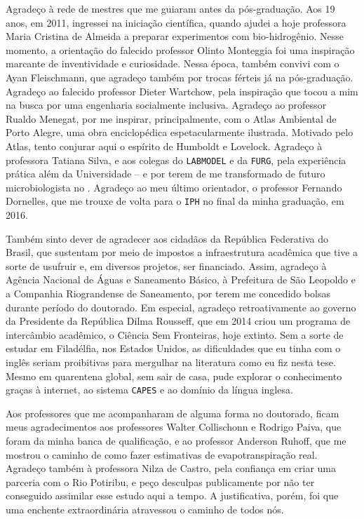\documentclass[./main.tex]{subfiles}
\begin{document}
\par Agradeço à rede de mestres que me guiaram antes da pós-graduação. Aos 19 anos, em 2011, ingressei na iniciação científica, quando ajudei a hoje professora Maria Cristina de Almeida a preparar experimentos com bio-hidrogênio. Nesse momento, a orientação do falecido professor Olinto Monteggia foi uma inspiração marcante de inventividade e curiosidade. Nessa época, também convivi com o Ayan Fleischmann, que agradeço também por trocas férteis já na pós-graduação. Agradeço ao falecido professor Dieter Wartchow, pela inspiração que tocou a mim na busca por uma engenharia socialmente inclusiva. Agradeço ao professor Rualdo Menegat, por me inspirar, principalmente, com o Atlas Ambiental de Porto Alegre, uma obra enciclopédica espetacularmente ilustrada. Motivado pelo Atlas, tento conjurar aqui o espírito de Humboldt e Lovelock. Agradeço à professora Tatiana Silva, e aos colegas do \texttt{LABMODEL} e da \texttt{FURG}, pela experiência prática além da Universidade -- e por terem de me transformado de futuro microbiologista no . Agradeço ao meu último orientador, o professor Fernando Dornelles, que me trouxe de volta para o \texttt{IPH} no final da minha graduação, em 2016. 

\par Também sinto dever de agradecer aos cidadãos da República Federativa do Brasil, que sustentam por meio de impostos a infraestrutura acadêmica que tive a sorte de usufruir e, em diversos projetos, ser financiado. Assim, agradeço à Agência Nacional de Águas e Saneamento Básico, à Prefeitura de São Leopoldo e a Companhia Riograndense de Saneamento, por terem me concedido bolsas durante período do doutorado. Em especial, agradeço retroativamente ao governo da Presidente da República Dilma Rousseff, que em 2014 criou um programa de intercâmbio acadêmico, o Ciência Sem Fronteiras, hoje extinto. Sem a sorte de estudar em Filadélfia, nos Estados Unidos, as dificuldades que eu tinha com o inglês seriam proibitivas para mergulhar na literatura como eu fiz nesta tese. Mesmo em quarentena global, sem sair de casa, pude explorar o conhecimento graças à internet, ao sistema \texttt{CAPES} e ao domínio da língua inglesa.

\par Aos professores que me acompanharam de alguma forma no doutorado, ficam meus agradecimentos aos professores Walter Collischonn e Rodrigo Paiva, que foram da minha banca de qualificação, e ao professor Anderson Ruhoff, que me mostrou o caminho de como fazer estimativas de evapotranspiração real. Agradeço também à professora Nilza de Castro, pela confiança em criar uma parceria com o Rio Potiribu, e peço desculpas publicamente por não ter conseguido assimilar esse estudo aqui a tempo. A justificativa, porém, foi que uma enchente extraordinária atravessou o caminho de todos nós.
\end{document}
